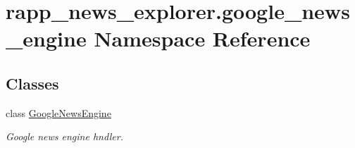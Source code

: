 \hypertarget{namespacerapp__news__explorer_1_1google__news__engine}{\section{rapp\-\_\-news\-\_\-explorer.\-google\-\_\-news\-\_\-engine Namespace Reference}
\label{namespacerapp__news__explorer_1_1google__news__engine}
}
\subsection*{Classes}
\begin{DoxyCompactItemize}
\item 
class \hyperlink{classrapp__news__explorer_1_1google__news__engine_1_1GoogleNewsEngine}{Google\-News\-Engine}
\begin{DoxyCompactList}\small\item\em Google news engine hndler. \end{DoxyCompactList}\end{DoxyCompactItemize}
